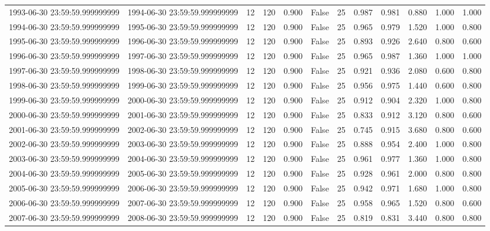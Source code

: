 \begin{table}
\begin{tabular}{lccccccccccc}
1993-06-30 23:59:59.999999999 & 1994-06-30 23:59:59.999999999 & 12 & 120 & 0.900 & False & 25 & 0.987 & 0.981 & 0.880 & 1.000 & 1.000 \\
1994-06-30 23:59:59.999999999 & 1995-06-30 23:59:59.999999999 & 12 & 120 & 0.900 & False & 25 & 0.965 & 0.979 & 1.520 & 1.000 & 0.800 \\
1995-06-30 23:59:59.999999999 & 1996-06-30 23:59:59.999999999 & 12 & 120 & 0.900 & False & 25 & 0.893 & 0.926 & 2.640 & 0.800 & 0.600 \\
1996-06-30 23:59:59.999999999 & 1997-06-30 23:59:59.999999999 & 12 & 120 & 0.900 & False & 25 & 0.965 & 0.987 & 1.360 & 1.000 & 1.000 \\
1997-06-30 23:59:59.999999999 & 1998-06-30 23:59:59.999999999 & 12 & 120 & 0.900 & False & 25 & 0.921 & 0.936 & 2.080 & 0.600 & 0.800 \\
1998-06-30 23:59:59.999999999 & 1999-06-30 23:59:59.999999999 & 12 & 120 & 0.900 & False & 25 & 0.956 & 0.975 & 1.440 & 0.600 & 0.800 \\
1999-06-30 23:59:59.999999999 & 2000-06-30 23:59:59.999999999 & 12 & 120 & 0.900 & False & 25 & 0.912 & 0.904 & 2.320 & 1.000 & 0.800 \\
2000-06-30 23:59:59.999999999 & 2001-06-30 23:59:59.999999999 & 12 & 120 & 0.900 & False & 25 & 0.833 & 0.912 & 3.120 & 0.800 & 0.600 \\
2001-06-30 23:59:59.999999999 & 2002-06-30 23:59:59.999999999 & 12 & 120 & 0.900 & False & 25 & 0.745 & 0.915 & 3.680 & 0.800 & 0.600 \\
2002-06-30 23:59:59.999999999 & 2003-06-30 23:59:59.999999999 & 12 & 120 & 0.900 & False & 25 & 0.888 & 0.954 & 2.400 & 1.000 & 0.800 \\
2003-06-30 23:59:59.999999999 & 2004-06-30 23:59:59.999999999 & 12 & 120 & 0.900 & False & 25 & 0.961 & 0.977 & 1.360 & 1.000 & 0.800 \\
2004-06-30 23:59:59.999999999 & 2005-06-30 23:59:59.999999999 & 12 & 120 & 0.900 & False & 25 & 0.928 & 0.961 & 2.000 & 0.800 & 0.800 \\
2005-06-30 23:59:59.999999999 & 2006-06-30 23:59:59.999999999 & 12 & 120 & 0.900 & False & 25 & 0.942 & 0.971 & 1.680 & 1.000 & 0.800 \\
2006-06-30 23:59:59.999999999 & 2007-06-30 23:59:59.999999999 & 12 & 120 & 0.900 & False & 25 & 0.958 & 0.965 & 1.520 & 0.800 & 0.600 \\
2007-06-30 23:59:59.999999999 & 2008-06-30 23:59:59.999999999 & 12 & 120 & 0.900 & False & 25 & 0.819 & 0.831 & 3.440 & 0.800 & 0.800 \\

\end{tabular}
\end{table}
